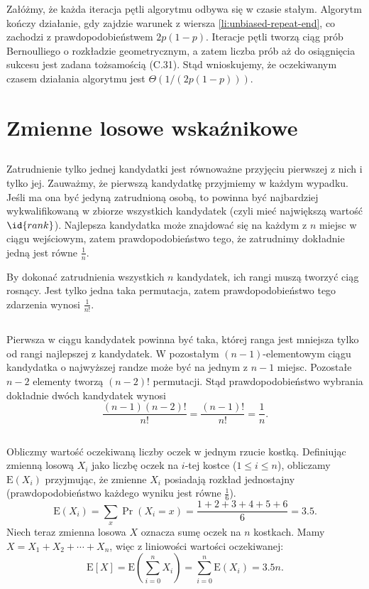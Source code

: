 Załóżmy, że każda iteracja pętli algorytmu odbywa się w czasie stałym. Algorytm kończy działanie, gdy zajdzie warunek z wiersza \ref{li:unbiased-repeat-end}, co zachodzi z prawdopodobieństwem $2p(1-p)$. Iteracje pętli tworzą ciąg prób Bernoulliego o rozkładzie geometrycznym, a zatem liczba prób aż do osiągnięcia sukcesu jest zadana tożsamością (C.31). Stąd wnioskujemy, że oczekiwanym czasem działania algorytmu jest $\Theta(1/(2p(1-p)))$.

\section{Zmienne losowe wskaźnikowe}

\subsection{} %
Zatrudnienie tylko jednej kandydatki jest równoważne przyjęciu pierwszej z nich i tylko jej. Zauważmy, że pierwszą kandydatkę przyjmiemy w każdym wypadku. Jeśli ma ona być jedyną zatrudnioną osobą, to powinna być najbardziej wykwalifikowaną w zbiorze wszystkich kandydatek (czyli mieć największą wartość $\id{rank}$). Najlepsza kandydatka może znajdować się na każdym z $n$ miejsc w ciągu wejściowym, zatem prawdopodobieństwo tego, że zatrudnimy dokładnie jedną jest równe $\frac{1}{n}$.

By dokonać zatrudnienia wszystkich $n$ kandydatek, ich rangi muszą tworzyć ciąg rosnący. Jest tylko jedna taka permutacja, zatem prawdopodobieństwo tego zdarzenia wynosi $\frac{1}{n!}$. 

\subsection{} %
Pierwsza w ciągu kandydatek powinna być taka, której ranga jest mniejsza tylko od rangi najlepszej z kandydatek. W pozostałym $(n-1)$-elementowym ciągu kandydatka o najwyższej randze może być na jednym z $n-1$ miejsc. Pozostałe $n-2$ elementy tworzą $(n-2)!$ permutacji. Stąd prawdopodobieństwo wybrania dokładnie dwóch kandydatek wynosi
\[
	\frac{(n-1)(n-2)!}{n!} = \frac{(n-1)!}{n!} = \frac{1}{n}.
\]

\subsection{} %
Obliczmy wartość oczekiwaną liczby oczek w jednym rzucie kostką. Definiując zmienną losową $X_i$ jako liczbę oczek na $i$-tej kostce ($1\le i\le n$), obliczamy $\mathrm{E}(X_i)$ przyjmując, że zmienne $X_i$ posiadają rozkład jednostajny (prawdopodobieństwo każdego wyniku jest równe $\frac{1}{6}$).
\[
	\mathrm{E}(X_i) = \sum_x\Pr(X_i=x) = \frac{1+2+3+4+5+6}{6} = 3.5.
\]
Niech teraz zmienna losowa $X$ oznacza sumę oczek na $n$ kostkach. Mamy $X=X_1+X_2+\cdots+X_n$, więc z liniowości wartości oczekiwanej:
\[
	\mathrm{E}[X] = \mathrm{E}\left(\sum_{i=0}^nX_i\right) = \sum_{i=0}^n\mathrm{E}(X_i) = 3.5n.
\]

